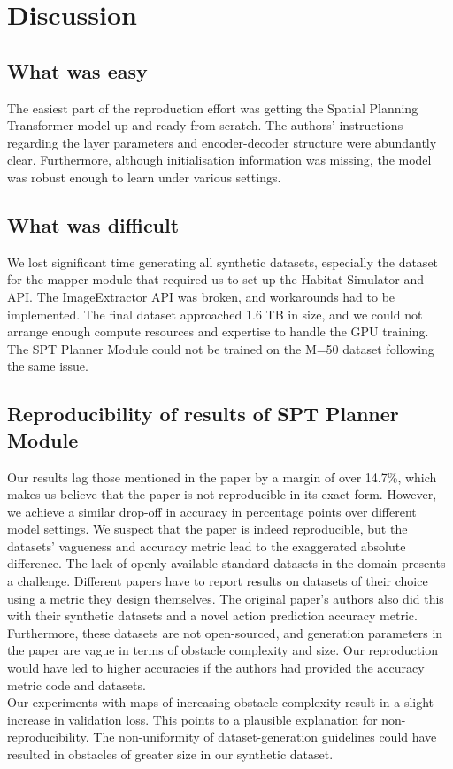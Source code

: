 \section{Discussion}
\subsection{What was easy}
The easiest part of the reproduction effort was getting the Spatial Planning Transformer model up and ready from scratch. The authors' instructions regarding the layer parameters and encoder-decoder structure were abundantly clear. Furthermore, although initialisation information was missing, the model was robust enough to learn under various settings.

\subsection{What was difficult}
We lost significant time generating all synthetic datasets, especially the dataset for the mapper module that required us to set up the Habitat Simulator and API. The ImageExtractor API was broken, and workarounds had to be implemented. The final dataset approached 1.6 TB in size, and we could not arrange enough compute resources and expertise to handle the GPU training. The SPT Planner Module could not be trained on the M=50 dataset following the same issue.
\subsection{Reproducibility of results of SPT Planner Module}
Our results lag those mentioned in the paper by a margin of over 14.7\%, which makes us believe that the paper is not reproducible in its exact form. However, we achieve a similar drop-off in accuracy in percentage points over different model settings. We suspect that the paper is indeed reproducible, but the datasets' vagueness and accuracy metric lead to the exaggerated absolute difference. The lack of openly available standard datasets in the domain presents a challenge. Different papers have to report results on datasets of their choice using a metric they design themselves. The original paper's authors also did this with their synthetic datasets and a novel action prediction accuracy metric. Furthermore, these datasets are not open-sourced, and generation parameters in the paper are vague in terms of obstacle complexity and size. Our reproduction would have led to higher accuracies if the authors had provided the accuracy metric code and datasets.\\
Our experiments with maps of increasing obstacle complexity result in a slight increase in validation loss. This points to a plausible explanation for non-reproducibility. The non-uniformity of dataset-generation guidelines could have resulted in obstacles of greater size in our synthetic dataset.
